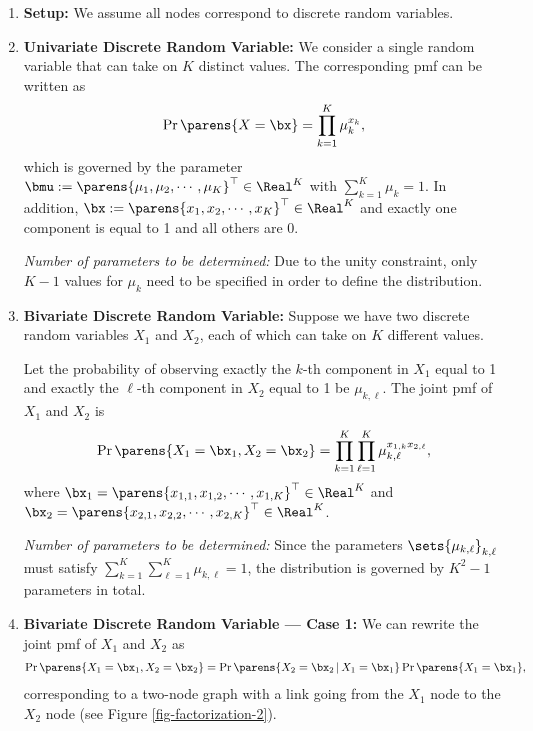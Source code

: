 \documentclass[12pt]{article}
\begin{document}
\begin{enumerate}[label=\textbf{\arabic*.}]

	\item \textbf{Setup:} We assume all nodes correspond to discrete random variables. 
	
	\item \textbf{Univariate Discrete Random Variable:} We consider a single random variable that can take on $K$ distinct values. The corresponding pmf can be written as 
	\begin{align*}
		\Pr \parens{X = \bx} = \prod_{k=1}^K \mu_{k}^{x_k}, 
	\end{align*}
	which is governed by the parameter $\bmu := \parens{\mu_1, \mu_2, \cdots, \mu_K}^\top \in \Real^K$ with $\sum_{k=1}^K \mu_k = 1$. In addition, $\bx := \parens{x_1, x_2, \cdots, x_K}^\top \in \Real^K$ and exactly one component is equal to 1 and all others are 0. 
	
	\textit{Number of parameters to be determined:} Due to the unity constraint, only $K-1$ values for $\mu_k$ need to be specified in order to define the distribution. 
	
	\item \textbf{Bivariate Discrete Random Variable:} Suppose we have two discrete random variables $X_1$ and $X_2$, each of which can take on $K$ different values. 
	
	Let the probability of observing exactly the $k$-th component in $X_1$ equal to 1 and exactly the $\ell$-th component in $X_2$ equal to 1 be $\mu_{k,\ell}$. The joint pmf of $X_1$ and $X_2$ is 
	\begin{align*}
		\Pr \parens{X_1 = \bx_1, X_2 = \bx_2} = \prod_{k=1}^K \prod_{\ell=1}^K \mu_{k,\ell}^{x_{1,k} x_{2,\ell}}, 
	\end{align*}
	where $\bx_1 = \parens{x_{1,1}, x_{1,2}, \cdots, x_{1,K}}^\top \in \Real^K$ and $\bx_2 = \parens{x_{2,1}, x_{2,2}, \cdots, x_{2,K}}^\top \in \Real^K$. 
	
	\textit{Number of parameters to be determined:} Since the parameters $\sets{\mu_{k,\ell}}_{k,\ell}$ must satisfy $\sum_{k=1}^K \sum_{\ell=1}^K \mu_{k,\ell} = 1$, the distribution is governed by $K^2-1$ parameters in total. 
	
	\item \textbf{Bivariate Discrete Random Variable --- Case 1:} We can rewrite the joint pmf of $X_1$ and $X_2$ as 
	\begin{align*}
		\Pr \parens{X_1 = \bx_1, X_2 = \bx_2} = \Pr \parens{X_2 = \bx_2 \,\vert\, X_1 = \bx_1} \Pr \parens{X_1 = \bx_1}, 
	\end{align*}
	corresponding to a two-node graph with a link going from the $X_1$ node to the $X_2$ node (see Figure \ref{fig-factorization-2}). 
	

\end{enumerate}
\end{document}

